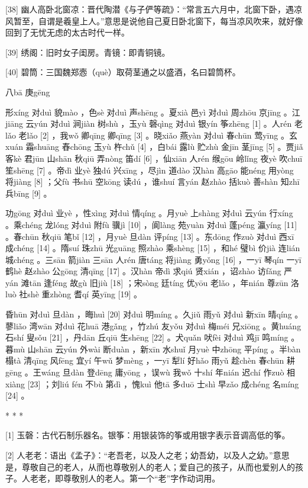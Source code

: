 \documentclass[12pt,UTF8]{ctexbook}
\begin{document}
[38] 幽人高卧北窗凉：晋代陶潜《与子俨等疏》：“常言五六月中，北窗下卧，遇凉风暂至，自谓是羲皇上人。”意思是说他自己夏日卧北窗下，每当凉风吹来，就好像回到了无忧无虑的太古时代一样。

[39] 绣阁：旧时女子闺房。青镜：即青铜镜。

[40] 碧筒：三国魏郑悫（què）取荷茎通之以盛酒，名曰碧筒杯。





八bā 庚gēng


形xíng 对duì 貌mào ，色sè 对duì 声shēng 。夏xià 邑yì 对duì 周zhōu 京jīng 。江jiāng 云yún 对duì 涧jiàn 树shù ，玉yù 磬qìng 对duì 银yín 筝zhēng [1] 。人rén 老lǎo 老lǎo [2] ，我wǒ 卿qīng 卿qīng [3] 。晓xiǎo 燕yàn 对duì 春chūn 莺yīng 。玄xuán 霜shuāng 舂chōng 玉yù 杵chǔ [4] ，白bái 露lù 贮zhù 金jīn 茎jīng [5] 。贾jiǎ 客kè 君jūn 山shān 秋qiū 弄nòng 笛dí [6] ，仙xiān 人rén 缑gōu 岭lǐng 夜yè 吹chuī 笙shēng [7] 。帝dì 业yè 独dú 兴xīng ，尽jìn 道dào 汉hàn 高gāo 能néng 用yòng 将jiàng [8] ；父fù 书shū 空kōng 读dú ，谁shuí 言yán 赵zhào 括kuò 善shàn 知zhī 兵bīng [9] 。

功gōng 对duì 业yè ，性xìng 对duì 情qíng 。月yuè 上shàng 对duì 云yún 行xíng 。乘chéng 龙lóng 对duì 附fù 骥jì [10] ，阆làng 苑yuàn 对duì 蓬péng 瀛yíng [11] 。春chūn 秋qiū 笔bǐ [12] ，月yuè 旦dàn 评píng [13] 。东dōng 作zuò 对duì 西xī 成chéng [14] 。隋suí 珠zhū 光guāng 照zhào 乘shèng [15] ，和hé 璧bì 价jià 连lián 城chéng 。三sān 箭jiàn 三sān 人rén 唐táng 将jiàng 勇yǒng [16] ，一yī 琴qín 一yī 鹤hè 赵zhào 公gōng 清qīng [17] 。汉hàn 帝dì 求qiú 贤xián ，诏zhào 访fǎng 严yán 滩tān 逢féng 故gù 旧jiù [18] ；宋sòng 廷tíng 优yōu 老lǎo ，年nián 尊zūn 洛luò 社shè 重zhòng 耆qí 英yīng [19] 。

昏hūn 对duì 旦dàn ，晦huì [20] 对duì 明míng 。久jiǔ 雨yǔ 对duì 新xīn 晴qíng 。蓼liǎo 湾wān 对duì 花huā 港gǎng ，竹zhú 友yǒu 对duì 梅méi 兄xiōng 。黄huáng 石shí 叟sǒu [21] ，丹dān 丘qiū 生shēng [22] 。犬quǎn 吠fèi 对duì 鸡jī 鸣míng 。暮mù 山shān 云yún 外wài 断duàn ，新xīn 水shuǐ 月yuè 中zhōng 平píng 。半bàn 榻tà 清qīng 风fēng 宜yí 午wǔ 梦mèng ，一yī 犁lí 好hǎo 雨yǔ 趁chèn 春chūn 耕gēng 。王wáng 旦dàn 登dēng 庸yōng ，误wù 我wǒ 十shí 年nián 迟chí 作zuò 相xiàng [23] ；刘liú fén 不bù 第dì ，愧kuì 他tā 多duō 士shì 早zǎo 成chéng 名míng [24] 。



* * *



[1] 玉磬：古代石制乐器名。银筝：用银装饰的筝或用银字表示音调高低的筝。

[2] 人老老：语出《孟子》：“老吾老，以及人之老；幼吾幼，以及人之幼。”意思是，尊敬自己的老人，从而也尊敬别人的老人；爱自己的孩子，从而也爱别人的孩子。人老老，即尊敬别人的老人。第一个“老”字作动词用。
\end{document}
